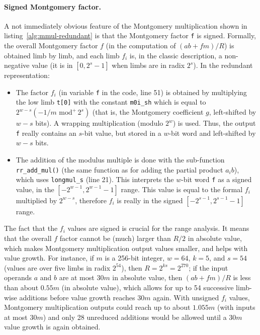 \documentclass{llncs}
\newcommand{\umod}[2]{#1 \,\,\text{mod}^{+}\, #2}
\begin{document}
\paragraph{Signed Montgomery factor.}
A not immediately obvious feature of the Montgomery multiplication shown
in listing~\ref{alg:mmul-redundant} is that the Montgomery factor
\verb+f+ is signed. Formally, the overall Montgomery factor $f$ (in the
computation of $(ab + fm)/R$) is obtained limb by limb, and each limb
$f_i$ is, in the classic description, a non-negative value (it is in
$[0, 2^s-1]$ when limbs are in radix $2^s$). In the redundant
representation:
\begin{itemize}

    \item The factor $f_i$ (in variable \verb+f+ in the code, line 51)
    is obtained by multiplying the low limb \verb+t[0]+ with the constant
    \verb+m0i_sh+ which is equal to $2^{w-s} (\umod{-1/m}{2^s})$ (that is,
    the Montgomery coefficient $g$, left-shifted by $w-s$ bits). A wrapping
    multiplication (modulo $2^w$) is used. Thus, the output \verb+f+
    really contains an $s$-bit value, but stored in a $w$-bit word and
    left-shifted by $w-s$ bits.

    \item The addition of the modulus multiple is done with the
    sub-function \verb+rr_add_mul()+ (the same function as for adding
    the partial product $a_i b$), which uses \verb+longmul_s+ (line 21).
    This interprets the $w$-bit word \verb+f+ as a signed value, in the
    $[-2^{w-1}, 2^{w-1} - 1]$ range. This value is equal to the formal
    $f_i$ multiplied by $2^{w-s}$, therefore $f_i$ is really in the
    signed $[-2^{s-1}, 2^{s-1} - 1]$ range.

\end{itemize}
The fact that the $f_i$ values are signed is crucial for the range
analysis. It means that the overall $f$ factor cannot be (much) larger
than $R/2$ in absolute value, which makes Montgomery multiplication
output values smaller, and helps with value growth. For instance, if
$m$ is a 256-bit integer, $w = 64$, $k = 5$, and $s = 54$ (values are
over five limbs in radix $2^{54}$), then $R = 2^{ks} = 2^{270}$; if
the input operands $a$ and $b$ are at most $30m$ in absolute value,
then $(ab + fm)/R$ is less than about $0.55m$ (in absolute value),
which allows for up to 54 successive limb-wise additions before value
growth reaches $30m$ again. With unsigned $f_i$ values, Montgomery
multiplication outputs could reach up to about $1.055m$ (with inputs
at most $30m$) and only 28 unreduced additions would be allowed until
a $30m$ value growth is again obtained.
\end{document}
